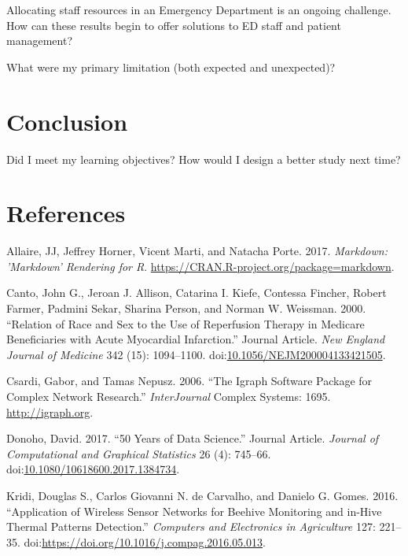 \documentclass[]{elsarticle} %
\begin{document}
Allocating staff resources in an Emergency Department is an ongoing
challenge. How can these results begin to offer solutions to ED staff
and patient management?

What were my primary limitation (both expected and unexpected)?

\section{Conclusion}\label{conclusion}

Did I meet my learning objectives? How would I design a better study
next time?

\section*{References}\label{references.unnumbered}

\hypertarget{refs}{}
\hypertarget{ref-MARKDOWN}{}
Allaire, JJ, Jeffrey Horner, Vicent Marti, and Natacha Porte. 2017.
\emph{Markdown: 'Markdown' Rendering for R}.
\url{https://CRAN.R-project.org/package=markdown}.

\hypertarget{ref-RN602}{}
Canto, John G., Jeroan J. Allison, Catarina I. Kiefe, Contessa Fincher,
Robert Farmer, Padmini Sekar, Sharina Person, and Norman W. Weissman.
2000. ``Relation of Race and Sex to the Use of Reperfusion Therapy in
Medicare Beneficiaries with Acute Myocardial Infarction.'' Journal
Article. \emph{New England Journal of Medicine} 342 (15): 1094--1100.
doi:\href{https://doi.org/10.1056/NEJM200004133421505}{10.1056/NEJM200004133421505}.

\hypertarget{ref-IGRAPH}{}
Csardi, Gabor, and Tamas Nepusz. 2006. ``The Igraph Software Package for
Complex Network Research.'' \emph{InterJournal} Complex Systems: 1695.
\url{http://igraph.org}.

\hypertarget{ref-RN794}{}
Donoho, David. 2017. ``50 Years of Data Science.'' Journal Article.
\emph{Journal of Computational and Graphical Statistics} 26 (4):
745--66.
doi:\href{https://doi.org/10.1080/10618600.2017.1384734}{10.1080/10618600.2017.1384734}.

\hypertarget{ref-BEES}{}
Kridi, Douglas S., Carlos Giovanni N. de Carvalho, and Danielo G. Gomes.
2016. ``Application of Wireless Sensor Networks for Beehive Monitoring
and in-Hive Thermal Patterns Detection.'' \emph{Computers and
Electronics in Agriculture} 127: 221--35.
doi:\href{https://doi.org/https://doi.org/10.1016/j.compag.2016.05.013}{https://doi.org/10.1016/j.compag.2016.05.013}.
\end{document}
